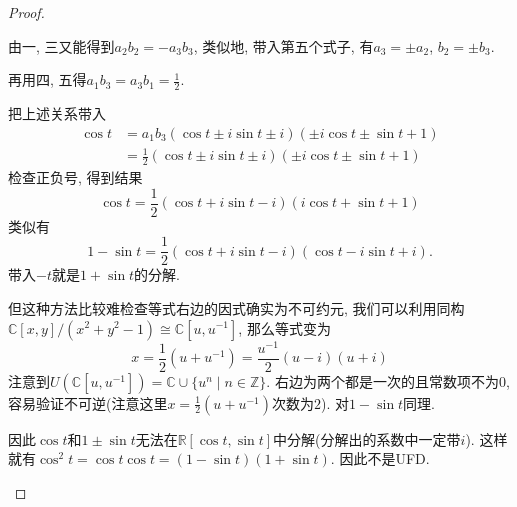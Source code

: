 \documentclass{../solutions-cn}
\begin{document}
\begin{proof}
\begin{enumerate}[(1)]
        由一, 三又能得到$a_2b_2 = -a_3b_3$, 类似地, 带入第五个式子, 有$a_3 = \pm a_2$, $b_2 = \pm b_3$.

        再用四, 五得$a_1b_3 = a_3b_1 = \frac{1}{2}$.

        把上述关系带入
        \[
        \begin{aligned}
            \cos t &= a_1b_3(\cos t \pm i\sin t \pm i)(\pm i\cos t \pm \sin t + 1)\\
            &= \frac{1}{2}(\cos t \pm i\sin t \pm i)(\pm i\cos t \pm \sin t + 1)
        \end{aligned}
        \]
        检查正负号, 得到结果
        \[
            \cos t = \frac{1}{2}(\cos t + i\sin t - i)(i\cos t + \sin t + 1)  
        \]
        类似有
        \[
            1 - \sin t = \frac{1}{2}(\cos t + i\sin t - i)(\cos t - i\sin t + i).
        \]
        带入$-t$就是$1 + \sin t$的分解.
    
        但这种方法比较难检查等式右边的因式确实为不可约元, 我们可以利用同构$\mathbb{C}[x, y]/(x^2 + y^2 - 1) \cong \mathbb{C}[u, u^{-1}]$, 那么等式变为
        \[
            x = \frac{1}{2}(u + u^{-1}) = \frac{u^{-1}}{2}(u - i)(u + i)
        \]
        注意到$U(\mathbb{C}[u, u^{-1}]) = \mathbb{C} \cup \{u^n \mid n \in \mathbb{Z}\}$. 右边为两个都是一次的且常数项不为$0$, 容易验证不可逆(注意这里$x = \frac{1}{2}(u + u^{-1})$次数为$2$). 对$1 - \sin t$同理.
    
        因此$\cos t$和$1 \pm \sin t$无法在$\mathbb{R}[\cos t, \sin t]$中分解(分解出的系数中一定带$i$). 这样就有$\cos^2 t = \cos t\cos t = (1 - \sin t)(1 + \sin t)$. 因此不是UFD.
    \end{enumerate}
\end{proof}
\end{document}
